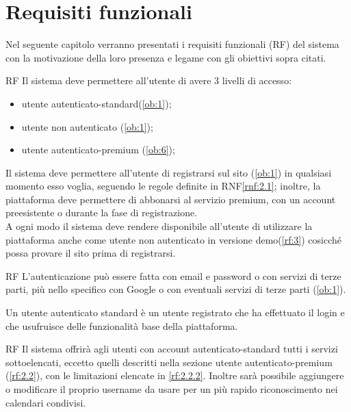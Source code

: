 \section{Requisiti funzionali}
\label{sec:RequisitiFunzionali}

Nel seguente capitolo verranno presentati i requisiti funzionali (RF) del sistema con la motivazione della loro presenza e legame con gli obiettivi sopra citati.

\begin{listaPersonale}{RF}
	 Il sistema deve permettere all'utente di avere 3 livelli di accesso:
	\begin{itemize}
		\item utente autenticato-standard(\ref{ob:1});
		\item utente non autenticato (\ref{ob:1});
		\item utente autenticato-premium (\ref{ob:6});
	\end{itemize}
	Il sistema deve permettere all'utente di registrarsi sul sito (\ref{ob:1}) in qualsiasi momento esso voglia, seguendo le regole definite in RNF\ref{rnf:2.1}; inoltre, la piattaforma deve permettere di abbonarsi al servizio premium, con un account preesistente o durante la fase di registrazione.\\
	A ogni modo il sistema deve rendere disponibile all'utente di utilizzare la piattaforma anche come utente non autenticato in versione demo(\ref{rf:3}) cosicché possa provare il sito prima di registrarsi.

	\begin{listaPersonale2}{RF}
		 L'autenticazione può essere fatta con email e password o con servizi di terze parti, più nello specifico con Google o con eventuali servizi di terze parti (\ref{ob:1}).
	\end{listaPersonale2}

	 Un utente autenticato standard è un utente registrato che ha effettuato il login e che usufruisce delle funzionalità base della piattaforma.

	\begin{listaPersonale2}{RF}
		 Il sistema offrirà agli utenti con account autenticato-standard tutti i servizi sottoelencati, eccetto quelli descritti nella sezione utente autenticato-premium (\ref{rf:2.2}), con le limitazioni elencate in \ref{rf:2.2.2}. Inoltre sarà possibile aggiungere o modificare il proprio username da usare per un più rapido riconoscimento nei calendari condivisi.


\end{listaPersonale2}
\end{listaPersonale}
